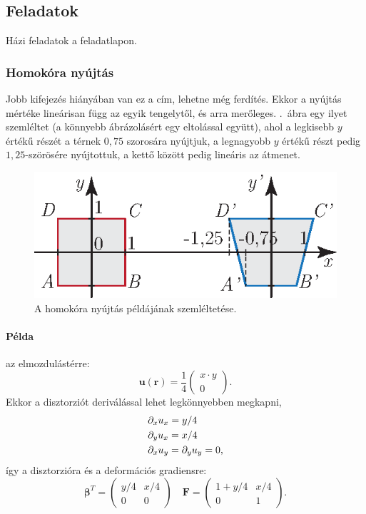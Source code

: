 \documentclass[12pt,a4paper]{scrartcl}
\let\mathbf\bm
\begin{document}
\subsection{Feladatok}
Házi feladatok a feladatlapon.

\subsubsection{Homokóra nyújtás}
Jobb kifejezés hiányában van ez a cím, lehetne még ferdítés. Ekkor a nyújtás mértéke lineárisan függ az egyik tengelytől, és arra merőleges. .\ ábra egy ilyet szemléltet (a könnyebb ábrázolásért egy eltolással együtt), ahol a legkisebb $y$ értékű részét a térnek $0{,}75$ szorosára nyújtjuk, a legnagyobb $y$ értékű részt pedig $1{,}25$-szörösére nyújtottuk, a kettő között pedig lineáris az átmenet.
\begin{figure}[htb] 
\centering    
\includegraphics[scale=1]{figs/homokora_nyujtas_szamolos.eps}
\caption{A homokóra nyújtás példájának szemléltetése.}
\label{fig:homokora_nyujtas_szamolos}
\end{figure}

\footnotesize
\paragraph{Példa} az elmozdulástérre:
\[{\mathbf{u}}\left( {\mathbf{r}} \right) = \frac{1}{4}\left( {\begin{array}{*{20}{c}}
  {x \cdot y} \\ 
  0 
\end{array}} \right).\]
Ekkor a disztorziót deriválással lehet legkönnyebben megkapni,
\[\begin{gathered}
  {\partial _x}{u_x} = y/4 \hfill \\
  {\partial _y}{u_x} = x/4 \hfill \\
  {\partial _x}{u_y} = {\partial _y}{u_y} = 0, \hfill \\ 
\end{gathered} \]
így a disztorzióra és a deformációs gradiensre:
\[{{\mathbf{\beta }}^T} = \left( {\begin{array}{*{20}{c}}
  {y/4}&{x/4} \\ 
  0&0 
\end{array}} \right)\quad {\mathbf{F}} = \left( {\begin{array}{*{20}{c}}
  {1 + y/4}&{x/4} \\ 
  0&1 
\end{array}} \right).\]
\end{document}
